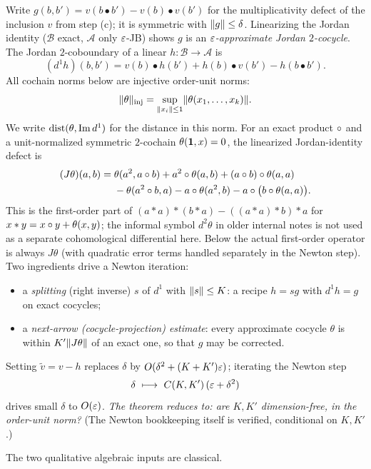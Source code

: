 Write $g(b,b')=v(b\bullet b')-v(b)\bullet v(b')$ for the multiplicativity defect
of the inclusion $v$ from step (c); it is symmetric with $\lVert g \rVert\le\delta$.
Linearizing the Jordan identity ($\mathcal B$ exact, $\mathcal A$ only $\varepsilon$-JB)
shows $g$ is an \emph{$\varepsilon$-approximate Jordan $2$-cocycle}. The Jordan
$2$-coboundary of a linear $h\colon\mathcal B\to\mathcal A$ is
\[
  (d^{1}h)(b,b')=v(b)\bullet h(b')+h(b)\bullet v(b')-h(b\bullet b').
\]
All cochain norms below are injective order-unit norms:
\[
  \lVert \theta \rVert_{\mathrm{inj}}
   =\sup_{\lVert x_i \rVert\le1}\lVert \theta(x_1,\dots,x_k) \rVert .
\]
We write $\operatorname{dist}(\theta,\operatorname{Im} d^1)$ for the distance in this norm.
For an exact product $\circ$ and a unit-normalized symmetric $2$-cochain
$\theta(\mathbf{1},x)=0$, the linearized Jordan-identity defect is
\[
\begin{aligned}
  (J\theta)(a,b)
  ={}&\theta(a^2,a\circ b)+a^2\circ\theta(a,b)
      +(a\circ b)\circ\theta(a,a) \\
    &-\theta(a^2\circ b,a)-a\circ\theta(a^2,b)
      -a\circ\bigl(b\circ\theta(a,a)\bigr).
\end{aligned}
\]
This is the first-order part of
$(a*a)*(b*a)-((a*a)*b)*a$ for $x*y=x\circ y+\theta(x,y)$; the informal symbol
$d^2\theta$ in older internal notes is not used as a separate cohomological
differential here. Below the actual first-order operator is always $J\theta$
(with quadratic error terms handled separately in the Newton step).
Two ingredients drive a Newton iteration:
\begin{itemize}[leftmargin=*]
  \item a \emph{splitting} (right inverse) $s$ of $d^1$ with
    $\lVert s \rVert\le K$: a recipe $h=sg$ with $d^1h=g$ on exact cocycles;
  \item a \emph{next-arrow (cocycle-projection) estimate}: every approximate
    cocycle $\theta$ is within $K'\lVert J\theta \rVert$ of an exact one, so that
    $g$ may be corrected.
\end{itemize}
Setting $\tilde v=v-h$ replaces $\delta$ by
$O(\delta^2+(K+K')\varepsilon)$; iterating the Newton step
\[
  \delta\ \longmapsto\ C(K,K')\,(\eps+\delta^2)
\]
drives small $\delta$ to $O(\varepsilon)$. \emph{The theorem reduces to: are $K,K'$
dimension-free, in the order-unit norm?} (The Newton bookkeeping itself is
verified, conditional on $K,K'$.)

The two qualitative algebraic inputs are classical.

